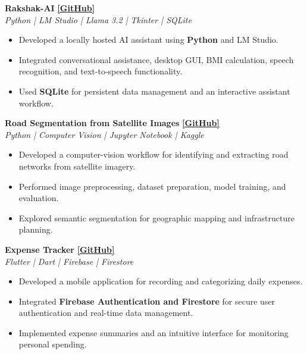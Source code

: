 \documentclass[10pt,a4paper]{article}
\newcommand{\resumeProject}[3]{
    \textbf{#1}
    \hfill
    \href{#3}{\textbf{[GitHub]}}
    \\
    \textit{#2}
    \vspace{1pt}
}
\newcommand{\resumeProjectEnd}{
    \vspace{3pt}
}
\begin{document}
\resumeProject
{Rakshak-AI}
{Python | LM Studio | Llama 3.2 | Tkinter | SQLite}
{https://github.com/BijoySarkar19/Rakshak-AI}

\begin{itemize}[leftmargin=14pt, itemsep=1pt, topsep=1pt]
    \item Developed a locally hosted AI assistant using \textbf{Python} and LM Studio.
    \item Integrated conversational assistance, desktop GUI, BMI calculation, speech recognition, and text-to-speech functionality.
    \item Used \textbf{SQLite} for persistent data management and an interactive assistant workflow.
\end{itemize}
\resumeProjectEnd

\resumeProject
{Road Segmentation from Satellite Images}
{Python | Computer Vision | Jupyter Notebook | Kaggle}
{https://github.com/BijoySarkar19/road-segmentation-satellite-imagery}

\begin{itemize}[leftmargin=14pt, itemsep=1pt, topsep=1pt]
    \item Developed a computer-vision workflow for identifying and extracting road networks from satellite imagery.
    \item Performed image preprocessing, dataset preparation, model training, and evaluation.
    \item Explored semantic segmentation for geographic mapping and infrastructure planning.
\end{itemize}
\resumeProjectEnd

\resumeProject
{Expense Tracker}
{Flutter | Dart | Firebase | Firestore}
{https://github.com/BijoySarkar19/ExpenseTracker1}

\begin{itemize}[leftmargin=14pt, itemsep=1pt, topsep=1pt]
    \item Developed a mobile application for recording and categorizing daily expenses.
    \item Integrated \textbf{Firebase Authentication and Firestore} for secure user authentication and real-time data management.
    \item Implemented expense summaries and an intuitive interface for monitoring personal spending.
\end{itemize}
\resumeProjectEnd
\end{document}
